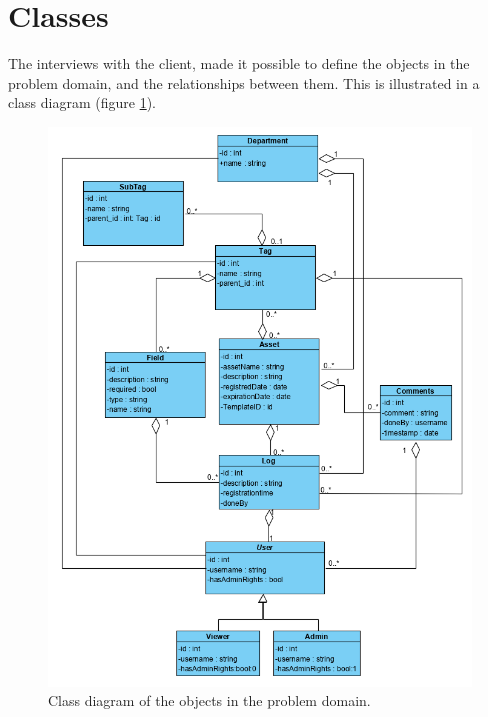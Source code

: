\section{Classes} \label{sc:classes}
The interviews with the client, made it possible to define the objects in the problem domain, and the relationships between them. This is illustrated in a class diagram (figure \ref{fig:ClassDiagram}).

\begin{figure}[H]
    \centering
    \includegraphics[width=1.0\textwidth]{figures/ClassDiagramV3.png}
    \caption{Class diagram of the objects in the problem domain.}
    \label{fig:ClassDiagram}
\end{figure}



